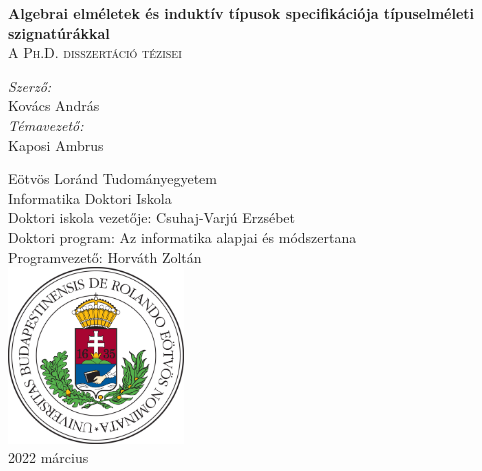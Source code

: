 \documentclass[12pt,a4paper,twosided]{article}
\begin{document}
\clearpage

\begin{titlepage}
    \begin{center}
        \vspace*{1cm}

        {\LARGE \textbf{Algebrai elméletek és induktív típusok specifikációja típuselméleti szignatúrákkal}}\\
        \vspace{1em}
        {\large \textsc{A Ph.D. disszertáció tézisei}}

        \vspace{2em}

        \textit{Szerző:}\\
        {\large Kovács András}\\
        \vspace{1em}
        \textit{Témavezető:}\\
        {\large Kaposi Ambrus}

        \vfill
        \vspace{4em}

        {\normalsize
        Eötvös Loránd Tudományegyetem\\
        Informatika Doktori Iskola\\
        Doktori iskola vezetője: Csuhaj-Varjú Erzsébet\\
        Doktori program: Az informatika alapjai és módszertana\\
        Programvezető: Horváth Zoltán\\}
        \vspace{1em}
        \includegraphics[width=0.35\textwidth]{elte_cimer_szines}\\
        \vspace{1em}
        {\large 2022 március}

    \end{center}
\end{titlepage}
\thispagestyle{empty}
\end{document}
